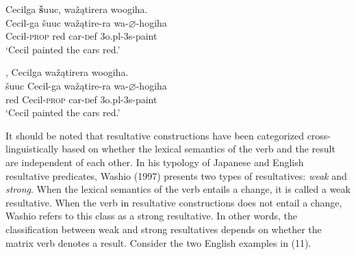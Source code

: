 \documentclass[output=paper]{LSP/langsci}
\begin{document}
\begin{exe}
\ex
\begin{xlist}

\ex \glll Cecilga {\textbf \v{s}uuc}, wa\v{z}\k{a}tirera woogiha. \\
 Cecil-ga \v{s}uuc  wa\v{z}\k{a}tire-ra wa-$\varnothing$-hogiha\\
 Cecil-\textsc{prop} red car-{\textsc def} {\textsc 3o.pl}-{\textsc 3s}-paint \\
\glt `Cecil painted the cars red.'

\ex {}, Cecilga wa\v{z}\k{a}tirera woogiha. \\
  \v{s}uuc Cecil-ga wa\v{z}\k{a}tire-ra wa-$\varnothing$-hogiha\\
red Cecil-\textsc{prop} car-{\textsc def} {\textsc 3o.pl}-{\textsc 3s}-paint \\
\glt `Cecil painted the cars red.'

\end{xlist}




\end{exe}

It should be noted that resultative constructions have been categorized cross-linguistically based on whether the lexical semantics of the verb and the result are independent of each other. In his typology of Japanese and English resultative predicates, Washio (1997) presents two types of resultatives: \textit{weak} and \textit{strong}. When the lexical semantics of the verb entails a change, it is called a weak resultative. When the verb in resultative constructions does not entail a change, Washio refers to this class as a strong resultative. In other words, the classification between weak and strong resultatives depends on whether the matrix verb denotes a result. Consider the two English examples in (11).

\begin{exe}
\ex
\begin{xlist}



\end{xlist}
\end{exe}
\end{document}
